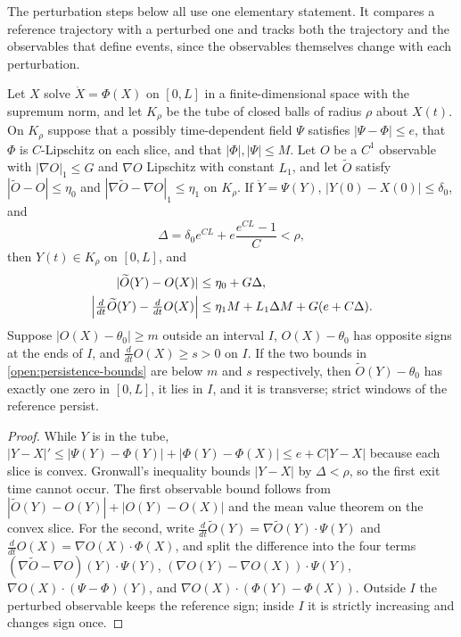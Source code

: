 The perturbation steps below all use one elementary statement. It compares a reference trajectory with a perturbed one and tracks both the trajectory and the observables that define events, since the observables themselves change with each perturbation.

Let $X$ solve $\dot X=\Phi(X)$ on $[0,L]$ in a finite-dimensional space with the supremum norm, and let $K_\rho$ be the tube of closed balls of radius $\rho$ about $X(t)$. On $K_\rho$ suppose that a possibly time-dependent field $\Psi$ satisfies $|\Psi-\Phi|\le e$, that $\Phi$ is $C$-Lipschitz on each slice, and that $|\Phi|,|\Psi|\le M$. Let $O$ be a $C^1$ observable with $|\nabla O|_1\le G$ and $\nabla O$ Lipschitz with constant $L_1$, and let $\widetilde O$ satisfy $|\widetilde O-O|\le\eta_0$ and $|\nabla\widetilde O-\nabla O|_1\le\eta_1$ on $K_\rho$. If $\dot Y=\Psi(Y)$, $|Y(0)-X(0)|\le\delta_0$, and
\begin{equation}
\Delta=\delta_0e^{CL}+e\frac{e^{CL}-1}{C}<\rho,
\end{equation}
then $Y(t)\in K_\rho$ on $[0,L]$, and
\begin{equation}
\begin{aligned}
|\widetilde O(Y)-O(X)|&\le\eta_0+G\Delta,\\
\Bigl|\tfrac{d}{dt}\widetilde O(Y)-\tfrac{d}{dt}O(X)\Bigr|
&\le\eta_1M+L_1\Delta M+G(e+C\Delta).
\end{aligned}
\label{open:persistence-bounds}
\end{equation}
Suppose $|O(X)-\theta_0|\ge m$ outside an interval $I$, $O(X)-\theta_0$ has opposite signs at the ends of $I$, and $\frac{d}{dt}O(X)\ge s>0$ on $I$. If the two bounds in \cref{open:persistence-bounds} are below $m$ and $s$ respectively, then $\widetilde O(Y)-\theta_0$ has exactly one zero in $[0,L]$, it lies in $I$, and it is transverse; strict windows of the reference persist.
\begin{proof}
While $Y$ is in the tube, $|Y-X|'\le|\Psi(Y)-\Phi(Y)|+|\Phi(Y)-\Phi(X)|\le e+C|Y-X|$ because each slice is convex. Gronwall's inequality bounds $|Y-X|$ by $\Delta<\rho$, so the first exit time cannot occur. The first observable bound follows from $|\widetilde O(Y)-O(Y)|+|O(Y)-O(X)|$ and the mean value theorem on the convex slice. For the second, write $\frac{d}{dt}\widetilde O(Y)=\nabla\widetilde O(Y)\cdot\Psi(Y)$ and $\frac{d}{dt}O(X)=\nabla O(X)\cdot\Phi(X)$, and split the difference into the four terms $(\nabla\widetilde O-\nabla O)(Y)\cdot\Psi(Y)$, $(\nabla O(Y)-\nabla O(X))\cdot\Psi(Y)$, $\nabla O(X)\cdot(\Psi-\Phi)(Y)$, and $\nabla O(X)\cdot(\Phi(Y)-\Phi(X))$. Outside $I$ the perturbed observable keeps the reference sign; inside $I$ it is strictly increasing and changes sign once.
\end{proof}

